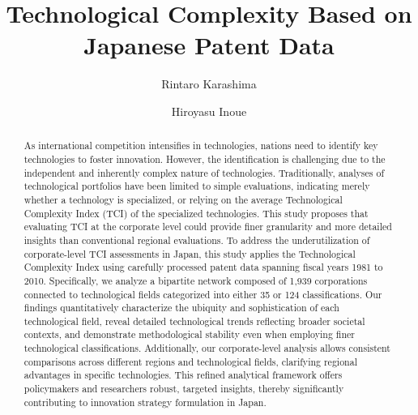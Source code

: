 \documentclass[fleqn,10pt]{wlscirep}
\begin{document}
\title{Technological Complexity Based on Japanese Patent Data}
\author[1]{Rintaro Karashima}
\author[1, 2, *]{Hiroyasu Inoue}



\begin{abstract}
As international competition intensifies in technologies, nations need to identify key technologies to foster innovation. 
However, the identification is challenging due to the independent and inherently complex nature of technologies. 
Traditionally, analyses of technological portfolios have been limited to simple evaluations, indicating merely whether a technology is specialized, or relying on the average Technological Complexity Index (TCI) of the specialized technologies. 
This study proposes that evaluating TCI at the corporate level could provide finer granularity and more detailed insights than conventional regional evaluations. 
To address the underutilization of corporate-level TCI assessments in Japan, this study applies the Technological Complexity Index using carefully processed patent data spanning fiscal years 1981 to 2010. 
Specifically, we analyze a bipartite network composed of 1,939 corporations connected to technological fields categorized into either 35 or 124 classifications. 
Our findings quantitatively characterize the ubiquity and sophistication of each technological field, reveal detailed technological trends reflecting broader societal contexts, and demonstrate methodological stability even when employing finer technological classifications. 
Additionally, our corporate-level analysis allows consistent comparisons across different regions and technological fields, clarifying regional advantages in specific technologies. 
This refined analytical framework offers policymakers and researchers robust, targeted insights, thereby significantly contributing to innovation strategy formulation in Japan.

\end{abstract}

\flushbottom
\maketitle

\thispagestyle{empty}
\end{document}

